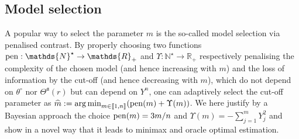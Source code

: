 \subsection{Model selection}\label{2.3}
A popular way to select the parameter $m$ is the so-called model selection via penalised contrast.
By properly choosing two functions $\pen : \mathds{N}^{\star} \rightarrow \mathds{R}_{+}$ and $\Upsilon : \mathds{N}^{\star} \rightarrow \mathds{R}_{+}$ respectively penalising the complexity of the chosen model (and hence increasing with $m$) and the loss of information by the cut-off (and hence decreasing with $m$), which do not depend on $\theta^{\circ}$ nor $\Theta^{\mathfrak{a}}(r)$ but can depend on $Y^{n}$, one can adaptively select the cut-off parameter as $\widehat{m}:=\operatorname*{arg\,min}_{m \in \llbracket 1, n \rrbracket}(\operatorname*{pen}(m) + \Upsilon(m))$.
We here justify by a Bayesian approach the choice $\operatorname*{pen}(m) = 3 m / n$ and $\Upsilon(m) = -\sum\limits_{j = 1}^{m} Y_{j}^{2}$ and show in a novel way that it leads to minimax and oracle optimal estimation.